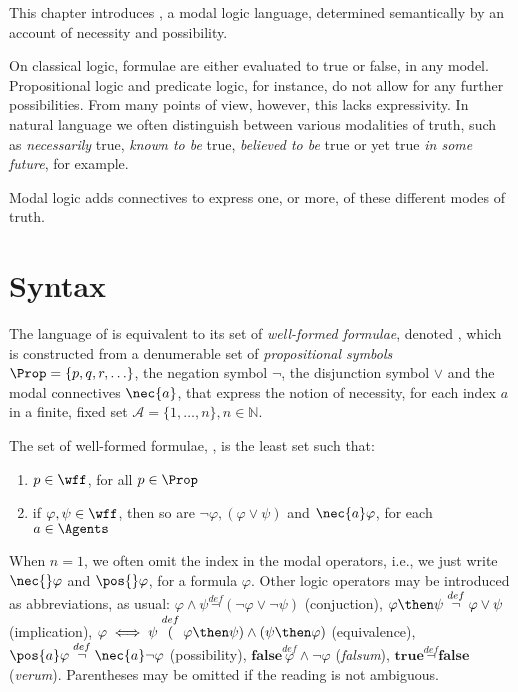 This chapter introduces , a modal logic language, determined
semantically by an account of necessity and possibility.

On classical logic, formulae are either evaluated to true or false, in any
model. Propositional logic and predicate logic, for instance, do not allow for
any further possibilities. From many points of view, however, this lacks
expressivity. In natural language we often distinguish between various
modalities of truth, such as \emph{necessarily} true, \emph{known to be} true,
\emph{believed to be} true or yet true \emph{in some future}, for example.

Modal logic adds connectives to express one, or more, of these different modes
of truth.

\section{Syntax}
The language of  is equivalent to its set of \emph{well-formed
formulae}, denoted \wff, which is constructed from a denumerable set of
\emph{propositional symbols} $\Prop = \{p, q, r, \ldots\}$, the negation
symbol $\neg$, the disjunction symbol $\lor$ and the modal connectives
$\nec{a}$, that express the notion of necessity, for each index $a$
in a finite, fixed set $\mathcal{A} = \{1, \ldots, n\}, n \in \mathbb{N}$.

\begin{definition}
\label{def:wff}
    The set of well-formed formulae, \wff, is the least set such that:
    \begin{enumerate}
        \item $p \in \wff$, for all $p \in \Prop$
            \vspace{.2ex}
        \item if $\varphi, \psi \in \wff$, then so are $\neg \varphi, (\varphi
            \lor \psi)$ and $\nec{a} \varphi$, for each $a \in \Agents$
    \end{enumerate}
\end{definition}

When $n = 1$, we often omit the index in the modal operators, i.e., we just write $\nec{} \varphi$ and $\pos{}\varphi$, for a formula $\varphi$. Other logic operators may be introduced as abbreviations, as usual:
$\varphi \wedge \psi \stackrel{def} \neg(\neg \varphi \lor \neg \psi)$
(conjuction),
$\varphi \then \psi \stackrel{def} \neg \varphi \lor \psi$ (implication),
$\varphi \iff \psi \stackrel{def} (\varphi \then \psi) \land (\psi \then
\varphi)$ (equivalence),
$\pos{a} \varphi \stackrel{def} \neg \nec{a} \neg \varphi$ (possibility),
$\textbf{false} \stackrel{def} \varphi \wedge \neg \varphi$ (\emph{falsum}),
$ \textbf{true} \stackrel{def} \neg \textbf{false}$ (\emph{verum}). Parentheses may be omitted if the reading is not ambiguous.

